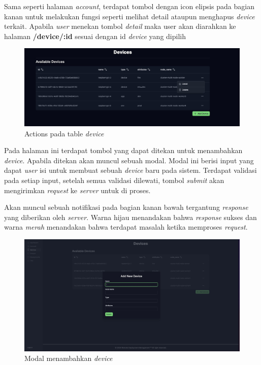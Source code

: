 Sama seperti halaman \textit{account}, terdapat tombol dengan icon elipsis pada bagian kanan untuk melakukan fungsi seperti melihat detail ataupun menghapus \textit{device} terkait. Apabila \textit{user} menekan tombol \textit{detail} maka user akan diarahkan ke halaman \textbf{/device/:id} sesuai dengan id \textit{device} yang dipilih

\begin{figure}[h]
  \centering
  \includegraphics[width=1\textwidth]{resources/chapter-4/dashboard/device-page-actions.jpg}
  \caption{Actions pada table \textit{device}}
  \label{fig:halaman-device-actions}
\end{figure}

Pada halaman ini terdapat tombol yang dapat ditekan untuk menambahkan \textit{device}. Apabila ditekan akan muncul sebuah modal. Modal ini berisi input yang dapat \textit{user} isi untuk membuat sebuah \textit{device} baru pada sistem. Terdapat validasi pada setiap input, setelah semua validasi dilewati, tombol \textit{submit} akan mengirimkan \textit{request} ke \textit{server} untuk di proses.

Akan muncul sebuah notifikasi pada bagian kanan bawah tergantung \textit{response} yang diberikan oleh \textit{server}. Warna hijau menandakan bahwa \textit{response} sukses dan warna \textit{merah} menandakan bahwa terdapat masalah ketika memproses \textit{request}.

\begin{figure}[h]
  \centering
  \includegraphics[width=1\textwidth]{resources/chapter-4/dashboard/device-page-add.jpg}
  \caption{Modal menambahkan \textit{device}}
  \label{fig:halaman-device-add}
\end{figure}



